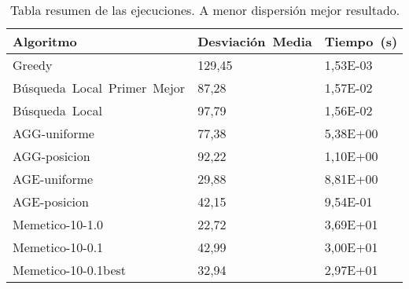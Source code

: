 \begin{table}[!ht]%
    \centering
    \begin{tabular}{|l|l|l|}
        \hline
        \textbf{Algoritmo} & \textbf{Desviación~Media} & \textbf{Tiempo~(s)} \\ \hline
        Greedy & 129,45 & 1,53E-03 \\ \hline
        Búsqueda~Local~Primer~Mejor & 87,28 & 1,57E-02 \\ \hline
        Búsqueda~Local & 97,79 & 1,56E-02 \\ \hline
        AGG-uniforme & 77,38 & 5,38E+00 \\ \hline
        AGG-posicion & 92,22 & 1,10E+00 \\ \hline
        AGE-uniforme & 29,88 & 8,81E+00 \\ \hline
        AGE-posicion & 42,15 & 9,54E-01 \\ \hline
        Memetico-10-1.0 & 22,72 & 3,69E+01 \\ \hline
        Memetico-10-0.1 & 42,99 & 3,00E+01 \\ \hline
        Memetico-10-0.1best & 32,94 & 2,97E+01 \\ \hline
    \end{tabular}
\caption{Tabla resumen de las ejecuciones. A menor dispersión mejor resultado.}
\end{table}